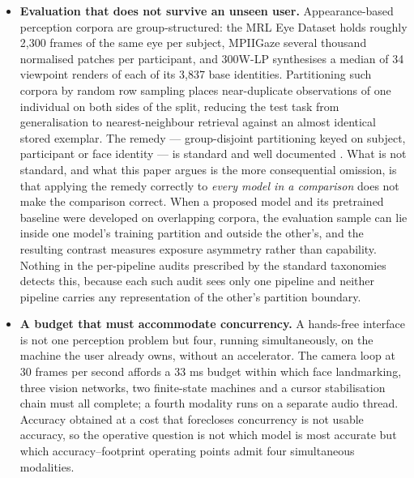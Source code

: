 \begin{itemize}
\item \textbf{Evaluation that does not survive an unseen user.} Appearance-based perception corpora are group-structured: the MRL Eye Dataset  holds roughly 2,300 frames of the same eye per subject, MPIIGaze  several thousand normalised patches per participant, and 300W-LP  synthesises a median of 34 viewpoint renders of each of its 3,837 base identities. Partitioning such corpora by random row sampling places near-duplicate observations of one individual on both sides of the split, reducing the test task from generalisation to nearest-neighbour retrieval against an almost identical stored exemplar. The remedy --- group-disjoint partitioning keyed on subject, participant or face identity --- is standard and well documented . What is not standard, and what this paper argues is the more consequential omission, is that applying the remedy correctly to \emph{every model in a comparison} does not make the comparison correct. When a proposed model and its pretrained baseline were developed on overlapping corpora, the evaluation sample can lie inside one model's training partition and outside the other's, and the resulting contrast measures exposure asymmetry rather than capability. Nothing in the per-pipeline audits prescribed by the standard taxonomies  detects this, because each such audit sees only one pipeline and neither pipeline carries any representation of the other's partition boundary.

\item \textbf{A budget that must accommodate concurrency.} A hands-free interface is not one perception problem but four, running simultaneously, on the machine the user already owns, without an accelerator. The camera loop at 30 frames per second affords a 33 ms budget within which face landmarking, three vision networks, two finite-state machines and a cursor stabilisation chain must all complete; a fourth modality runs on a separate audio thread. Accuracy obtained at a cost that forecloses concurrency is not usable accuracy, so the operative question is not which model is most accurate but which accuracy--footprint operating points admit four simultaneous modalities.


\end{itemize}
